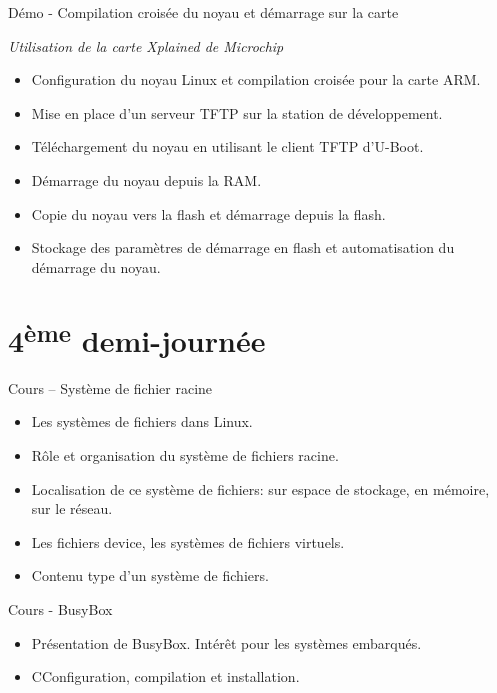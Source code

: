 \documentclass[a4paper,12pt,obeyspaces,spaces,hyphens]{article}
\begin{document}
\feagendaonecolumn
{Démo - Compilation croisée du noyau et démarrage sur la carte}
{
  {\em Utilisation de la carte Xplained de Microchip}
  \begin{itemize}
  \item Configuration du noyau Linux et compilation croisée pour la carte ARM.
  \item Mise en place d'un serveur TFTP sur la station de développement.
  \item Téléchargement du noyau en utilisant le client TFTP d'U-Boot.
  \item Démarrage du noyau depuis la RAM.
  \item Copie du noyau vers la flash et démarrage depuis la flash.
  \item Stockage des paramètres de démarrage en flash et automatisation
	du démarrage du noyau.
  \end{itemize}
}

\section{4\textsuperscript{ème} demi-journée}

\feagendatwocolumn
{Cours – Système de fichier racine}
{
  \begin{itemize}
  \item Les systèmes de fichiers dans Linux.
  \item Rôle et organisation du système de fichiers racine.
  \item Localisation de ce système de fichiers: sur espace
	de stockage, en mémoire, sur le réseau.
  \item Les fichiers device, les systèmes de fichiers virtuels.
  \item Contenu type d'un système de fichiers.
  \end{itemize}
}
{Cours - BusyBox}
{
  \begin{itemize}
  \item Présentation de BusyBox. Intérêt pour les systèmes embarqués.
  \item CConfiguration, compilation et installation.
  \end{itemize}
}
\end{document}
